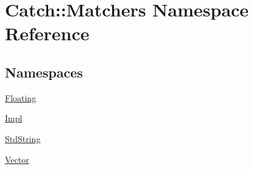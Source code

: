 \hypertarget{namespace_catch_1_1_matchers}{}\section{Catch\+:\+:Matchers Namespace Reference}
\label{namespace_catch_1_1_matchers}
\subsection*{Namespaces}
\begin{DoxyCompactItemize}
\item 
 \mbox{\hyperlink{namespace_catch_1_1_matchers_1_1_floating}{Floating}}
\item 
 \mbox{\hyperlink{namespace_catch_1_1_matchers_1_1_impl}{Impl}}
\item 
 \mbox{\hyperlink{namespace_catch_1_1_matchers_1_1_std_string}{Std\+String}}
\item 
 \mbox{\hyperlink{namespace_catch_1_1_matchers_1_1_vector}{Vector}}
\end{DoxyCompactItemize}
